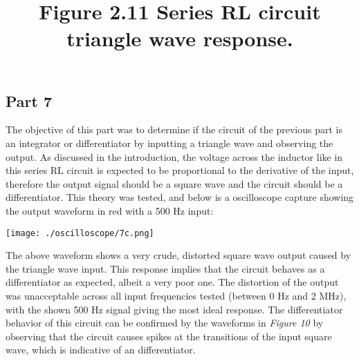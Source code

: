 \documentclass[12pt]{article}
\begin{document}
\subsection*{Part 7}
The objective of this part was to determine if the circuit of the previous part is an integrator or differentiator by inputting a triangle wave and observing the output. As discussed in the introduction, the voltage across the inductor like in this series RL circuit is expected to be proportional to the derivative of the input, therefore the output signal should be a square wave and the circuit should be a differentiator. This theory was tested, and below is a oscilloscope capture showing the output waveform in red with a 500 Hz input:\par\vspace{6pt}
\title{\textbf{Figure 2.11} Series RL circuit triangle wave response.}
\begin{center}
 \texttt{[image: ./oscilloscope/7c.png]}
\end{center}
The above waveform shows a very crude, distorted square wave output caused by the triangle wave input. This response implies that the circuit behaves as a differentiator as expected, albeit a very poor one. The distortion of the output was unacceptable across all input frequencies tested (between 0 Hz and 2 MHz), with the shown 500 Hz signal giving the most ideal response. The differentiator behavior of this circuit can be confirmed by the waveforms in \textit{Figure 10} by observing that the circuit causes spikes at the transitions of the input square wave, which is indicative of an differentiator.
\pagebreak
\end{document}
